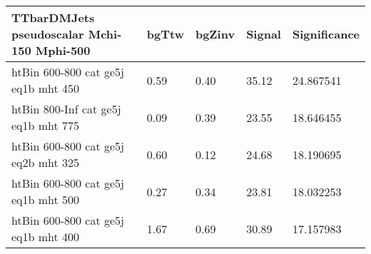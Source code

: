  \begin{tabular}{|l|l|l|l|l|}
\small
   \label{mostSensitiveBins_TTbarDMJets_pseudoscalar_Mchi-150_Mphi-500_25ns}
	\textbf{TTbarDMJets pseudoscalar Mchi-150 Mphi-500}	 & 	bgTtw	 & 	bgZinv	 & 	Signal &	 Significance \\ 
	\hline
	htBin 600-800 cat ge5j eq1b mht 450 & 	0.59	 & 	0.40	 & 	35.12 	&24.867541 \\ 
	htBin 800-Inf cat ge5j eq1b mht 775 & 	0.09	 & 	0.39	 & 	23.55 	&18.646455 \\ 
	htBin 600-800 cat ge5j eq2b mht 325 & 	0.60	 & 	0.12	 & 	24.68 	&18.190695 \\ 
	htBin 600-800 cat ge5j eq1b mht 500 & 	0.27	 & 	0.34	 & 	23.81 	&18.032253 \\ 
	htBin 600-800 cat ge5j eq1b mht 400 & 	1.67	 & 	0.69	 & 	30.89 	&17.157983 \\ 
\end{tabular}

